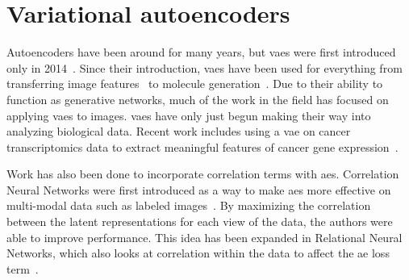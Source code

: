 \section{Variational autoencoders}
Autoencoders have been around for many years, but \glspl{vae} were first introduced only in 2014~\cite{kingma2013auto, rezende2014stochastic}.
Since their introduction, \glspl{vae} have been used for everything from transferring image features~\cite{larsen2015autoencoding} to molecule generation~\cite{gomez2016automatic}.
Due to their ability to function as generative networks, much of the work in the field has focused on applying \glspl{vae} to images.
\glspl{vae} have only just begun making their way into analyzing biological data.
Recent work includes using a \gls{vae} on cancer transcriptomics data to extract meaningful features of cancer gene expression~\cite{way2017extracting}.

Work has also been done to incorporate correlation terms with \glspl{ae}.
Correlation Neural Networks were first introduced as a way to make \glspl{ae} more effective on multi-modal data such as labeled images~\cite{chandar2016correlational}.
By maximizing the correlation between the latent representations for each view of the data, the authors were able to improve performance.
This idea has been expanded in Relational Neural Networks, which also looks at correlation within the data to affect the \gls{ae} loss term~\cite{meng2017relational}.